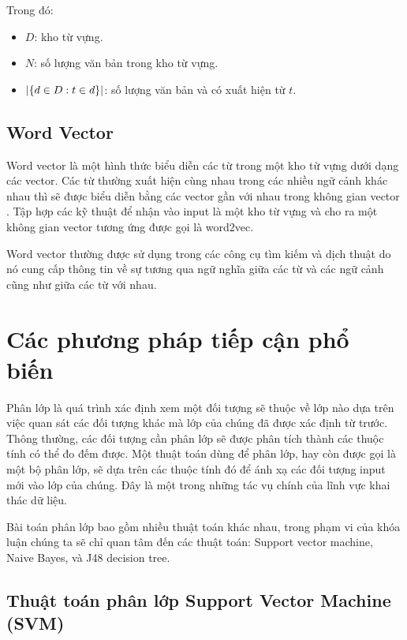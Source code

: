 Trong đó:
\begin{itemize}
  \item $D$: kho từ vựng.
  \item $N$: số lượng văn bản trong kho từ vựng.
  \item $\abs{\{d \in D: t \in d \}}$: số lượng văn bản và có xuất hiện từ $t$. 
\end{itemize}
	\subsection*{Word Vector}
Word vector là một hình thức biểu diễn các từ trong một kho từ vựng dưới dạng các vector. Các từ thường xuất hiện cùng nhau trong các nhiều ngữ cảnh khác nhau thì sẽ được biểu diễn bằng các vector gần với nhau trong không gian vector \cite{mikolov:word2vec}. Tập hợp các kỹ thuật để nhận vào input là một kho từ vựng và cho ra một không gian vector tương ứng được gọi là word2vec.

  Word vector thường được sử dụng trong các công cụ tìm kiếm và dịch thuật do nó cung cấp thông tin về sự tương qua ngữ nghĩa giữa các từ và các ngữ cảnh cũng như giữa các từ với nhau.

\section{Các phương pháp tiếp cận phổ biến}
Phân lớp là quá trình xác định xem một đối tượng sẽ thuộc về lớp nào dựa trên việc quan sát các đối tượng khác mà lớp của chúng đã được xác định từ trước. Thông thường, các đối tượng cần phân lớp sẽ được phân tích thành các thuộc tính có thể đo đếm được. Một thuật toán dùng để phân lớp, hay còn được gọi là một bộ phân lớp, sẽ dựa trên các thuộc tính đó để ánh xạ các đối tượng input mới vào lớp của chúng. Đây là một trong những tác vụ chính của lĩnh vực khai thác dữ liệu.

Bài toán phân lớp bao gồm nhiều thuật toán khác nhau, trong phạm vi của khóa luận chúng ta sẽ chỉ quan tâm đến các thuật toán: Support vector machine, Naive Bayes, và J48 decision tree.
\subsection{Thuật toán phân lớp Support Vector Machine (SVM)}
